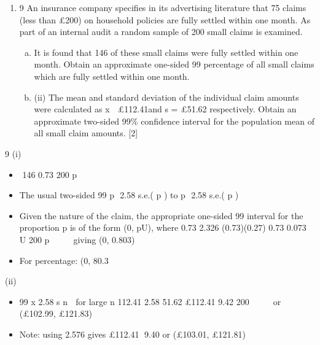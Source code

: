 \documentclass[a4paper,12pt]{article}
\begin{document}
\begin{enumerate}
\item 9 An insurance company specifies in its advertising literature that 75%
claims (less than £200) on household policies are fully settled within one month. As
part of an internal audit a random sample of 200 small claims is examined.
\begin{enumerate}[(a)]
    \item It is found that 146 of these small claims were fully settled within one month.
Obtain an approximate one-sided 99%
percentage of all small claims which are fully settled within one month. 
\item (ii) The mean and standard deviation of the individual claim amounts were
calculated as x  £112.41and s = £51.62 respectively. Obtain an approximate
two-sided 99\% confidence interval for the population mean of all small claim
amounts. [2]
\end{enumerate}

\end{enumerate}
\newpage

9 (i)
\begin{itemize} \item  146 0.73
200
p 
\item The usual two-sided 99%
p  2.58 s.e.( p ) to p  2.58 s.e.( p )
\item Given the nature of the claim, the appropriate one-sided 99%
interval for the proportion p is of the form (0, pU),
where 0.73 2.326 (0.73)(0.27) 0.73 0.073
U 200 p     giving (0, 0.803)
\item For percentage: (0, 80.3%
\end{itemize}
(ii) 
\begin{itemize} \item 99%
x 2.58 s
n
 for large n
112.41 2.58 51.62 £112.41 9.42
200
    or (£102.99, £121.83)
\item Note: using 2.576 gives £112.41 9.40 or (£103.01, £121.81)
\end{itemize}
\end{document}
